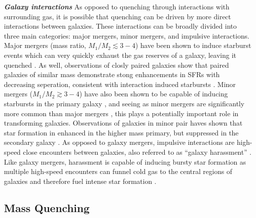 \noindent \textit{\textbf{Galaxy interactions}}
\smallskip
\newline
As opposed to quenching through interactions with surrounding gas, it
is possible that quenching can be driven by more direct interactions
between galaxies.  These interactions can be broadly divided into
three main categories: major mergers, minor mergers, and impulsive
interactions.  Major mergers (mass ratio, $M_1/M_2 \lesssim 3-4$) have
been shown to induce starburst events which can very quickly exhaust the gas
reserves of a galaxy, leaving it quenched \citep[e.g.][]{mihos1994b}.
As well, observations of closly paired galaxies show that paired
galaxies of similar mass demonstrate stong enhancements in SFRs with
decreasing seperation, consistent with interaction induced starbursts
\citep{ellison2008, davies2015}.  Minor mergers ($M_1/M_2 \gtrsim
3-4$) have also been shown to be capable of inducing starbursts in the
primary galaxy \citep[e.g.][]{mihos1994a}, and seeing as minor mergers
are significantly more common than major mergers \citep{lotz2011},
this plays a potentially important role in transforming galaxies.
Observations of galaxies in minor pair haves shown that star formation
in enhanced in the higher mass primary, but suppressed in the
secondary galaxy \citep{davies2015}.  As opposed to galaxy mergers,
impulsive interactions are high-speed close encounters between
galaxies, also referred to as ``galaxy harassment'' \citep{moore1996}.
Like galaxy mergers, harassment is capable of inducing bursty star
formation as multiple high-speed encounters can funnel cold gas to the
central regions of galaxies and therefore fuel intense star formation
\citep{fujita1998}.  

\subsection{Mass Quenching}
\label{mass_quench}


